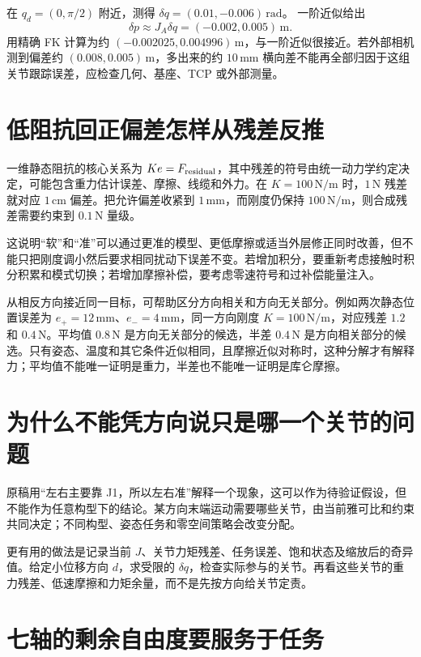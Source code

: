 \begin{examplebox}[关节误差怎样变成毫米偏差]
在 $q_d=(0,\pi/2)$ 附近，测得 $\delta q=(0.01,-0.006)\,\mathrm{rad}$。
一阶近似给出
\[
\delta p\approx J_A\delta q=(-0.002,0.005)\,\mathrm m.
\]
用精确 FK 计算为约 $(-0.002025,0.004996)\,\mathrm m$，与一阶近似很接近。若外部相机测到偏差约 $(0.008,0.005)\,\mathrm m$，多出来的约 $10\,\mathrm{mm}$ 横向差不能再全部归因于这组关节跟踪误差，应检查几何、基座、TCP 或外部测量。
\end{examplebox}

\section{低阻抗回正偏差怎样从残差反推}

一维静态阻抗的核心关系为 $Ke=F_{\rm residual}$，其中残差的符号由统一动力学约定决定，可能包含重力估计误差、摩擦、线缆和外力。在 $K=100\,\mathrm{N/m}$ 时，$1\,\mathrm N$ 残差就对应 $1\,\mathrm{cm}$ 偏差。把允许偏差收紧到 $1\,\mathrm{mm}$，而刚度仍保持 $100\,\mathrm{N/m}$，则合成残差需要约束到 $0.1\,\mathrm N$ 量级。

这说明“软”和“准”可以通过更准的模型、更低摩擦或适当外层修正同时改善，但不能只把刚度调小然后要求相同扰动下误差不变。若增加积分，要重新考虑接触时积分积累和模式切换；若增加摩擦补偿，要考虑零速符号和过补偿能量注入。

从相反方向接近同一目标，可帮助区分方向相关和方向无关部分。例如两次静态位置误差为 $e_+=12\,\mathrm{mm}$、$e_-=4\,\mathrm{mm}$，同一方向刚度 $K=100\,\mathrm{N/m}$，对应残差 $1.2$ 和 $0.4\,\mathrm N$。平均值 $0.8\,\mathrm N$ 是方向无关部分的候选，半差 $0.4\,\mathrm N$ 是方向相关部分的候选。只有姿态、温度和其它条件近似相同，且摩擦近似对称时，这种分解才有解释力；平均值不能唯一证明是重力，半差也不能唯一证明是库仑摩擦。

\section{为什么不能凭方向说只是哪一个关节的问题}

原稿用“左右主要靠 J1，所以左右准”解释一个现象，这可以作为待验证假设，但不能作为任意构型下的结论。某方向末端运动需要哪些关节，由当前雅可比和约束共同决定；不同构型、姿态任务和零空间策略会改变分配。

更有用的做法是记录当前 $J$、关节力矩残差、任务误差、饱和状态及缩放后的奇异值。给定小位移方向 $d$，求受限的 $\delta q$，检查实际参与的关节。再看这些关节的重力残差、低速摩擦和力矩余量，而不是先按方向给关节定责。

\section{七轴的剩余自由度要服务于任务}

